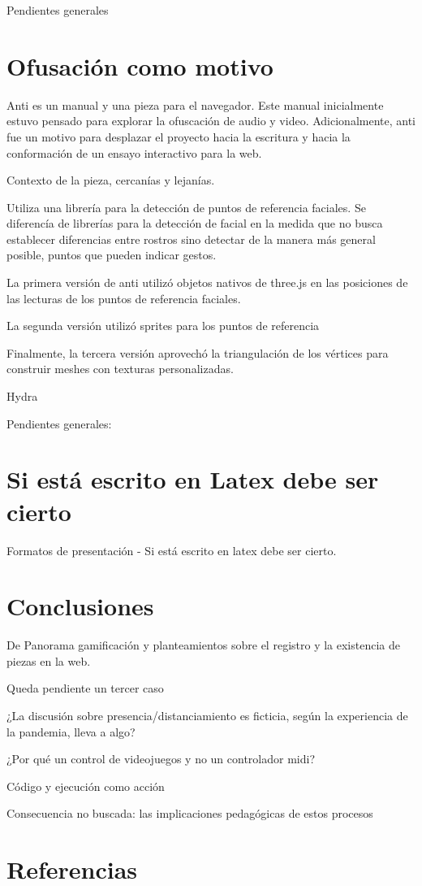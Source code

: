 \documentclass[11pt,letterpaper, twocolumn, twoside, openright,
headinclude,footinclude,BCOR5mm,
numbers=noenddot,cleardoublepage=empty,
tablecaptionabove]{article}
\begin{document}
Pendientes generales 

\section*{Ofusación como motivo}

Anti es un manual y una pieza para el navegador. Este manual inicialmente estuvo pensado para explorar la ofuscación de audio y video. Adicionalmente, anti fue un motivo para desplazar el proyecto hacia la escritura y hacia la conformación de un ensayo interactivo para la web. 

Contexto de la pieza, cercanías y lejanías. 

Utiliza una librería para la detección de puntos de referencia faciales. Se diferencía de librerías para la detección de facial en la medida que no busca establecer diferencias entre rostros sino detectar de la manera más general posible, puntos que pueden indicar gestos. 

La primera versión de anti utilizó objetos nativos de three.js en las posiciones de las lecturas de los puntos de referencia faciales.

La segunda versión utilizó sprites para los puntos de referencia 

Finalmente, la tercera versión aprovechó la triangulación de los vértices para construir meshes con texturas personalizadas. 

Hydra

Pendientes generales: 

\section*{Si está escrito en Latex debe ser cierto}

Formatos de presentación - Si está escrito en latex debe ser cierto. 

\section*{Conclusiones} %

De Panorama gamificación y planteamientos sobre el registro y la existencia de piezas en la web. 

Queda pendiente un tercer caso

¿La discusión sobre presencia/distanciamiento es ficticia, según la experiencia de la pandemia, lleva a algo?

¿Por qué un control de videojuegos y no un controlador midi? 

Código y ejecución como acción 

Consecuencia no buscada: las implicaciones pedagógicas de estos procesos 

\section*{Referencias} 
\end{document}
